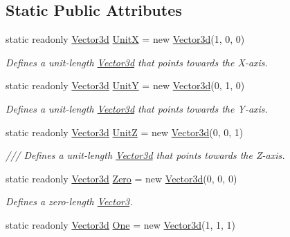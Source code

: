 \subsection*{Static Public Attributes}
\begin{DoxyCompactItemize}
\item 
static readonly \hyperlink{struct_open_t_k_1_1_vector3d}{Vector3d} \hyperlink{struct_open_t_k_1_1_vector3d_a1df7baf64afca7d17602d5f072e188c9}{Unit\-X} = new \hyperlink{struct_open_t_k_1_1_vector3d}{Vector3d}(1, 0, 0)
\begin{DoxyCompactList}\small\item\em Defines a unit-\/length \hyperlink{struct_open_t_k_1_1_vector3d}{Vector3d} that points towards the X-\/axis. \end{DoxyCompactList}\item 
static readonly \hyperlink{struct_open_t_k_1_1_vector3d}{Vector3d} \hyperlink{struct_open_t_k_1_1_vector3d_a020b45e3c1a0b417aff18e3deb4a9942}{Unit\-Y} = new \hyperlink{struct_open_t_k_1_1_vector3d}{Vector3d}(0, 1, 0)
\begin{DoxyCompactList}\small\item\em Defines a unit-\/length \hyperlink{struct_open_t_k_1_1_vector3d}{Vector3d} that points towards the Y-\/axis. \end{DoxyCompactList}\item 
static readonly \hyperlink{struct_open_t_k_1_1_vector3d}{Vector3d} \hyperlink{struct_open_t_k_1_1_vector3d_aa843d07a35e3d275f117d252877d2e55}{Unit\-Z} = new \hyperlink{struct_open_t_k_1_1_vector3d}{Vector3d}(0, 0, 1)
\begin{DoxyCompactList}\small\item\em /// Defines a unit-\/length \hyperlink{struct_open_t_k_1_1_vector3d}{Vector3d} that points towards the Z-\/axis. \end{DoxyCompactList}\item 
static readonly \hyperlink{struct_open_t_k_1_1_vector3d}{Vector3d} \hyperlink{struct_open_t_k_1_1_vector3d_ab7ac2adf76ddd6450d2a1e10ca2e22c1}{Zero} = new \hyperlink{struct_open_t_k_1_1_vector3d}{Vector3d}(0, 0, 0)
\begin{DoxyCompactList}\small\item\em Defines a zero-\/length \hyperlink{struct_open_t_k_1_1_vector3}{Vector3}. \end{DoxyCompactList}\item 
static readonly \hyperlink{struct_open_t_k_1_1_vector3d}{Vector3d} \hyperlink{struct_open_t_k_1_1_vector3d_a41eced555e80b5f7f7146ddddb165e85}{One} = new \hyperlink{struct_open_t_k_1_1_vector3d}{Vector3d}(1, 1, 1)

\end{DoxyCompactItemize}
